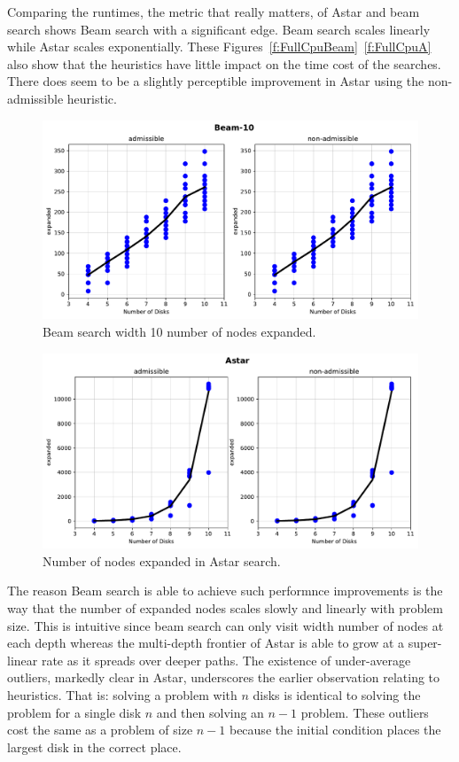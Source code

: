 \documentclass[12pt]{article}
\begin{document}
Comparing the runtimes, the metric that really matters, of Astar and beam search shows Beam search with a significant edge.
Beam search scales linearly while Astar scales exponentially.
These Figures~\ref{f:FullCpuBeam}~\ref{f:FullCpuA} also show that the heuristics have little impact on the time cost of the searches. 
There does seem to be a slightly perceptible improvement in Astar using the non-admissible heuristic.

\begin{figure}[H]
	\centering
    \includegraphics[width=.85\textwidth]{FullExpandedBeam-10}	
	\caption{Beam search width 10 number of nodes expanded.}
	\label{f:FullExBeam}
\end{figure}
\begin{figure}[H]
	\centering
    \includegraphics[width=.85\textwidth]{FullExpandedAstar}
	\caption{Number of nodes expanded in Astar search.}
	\label{f:FullExA}	
\end{figure}

The reason Beam search is able to achieve such performnce improvements is the way that the number of expanded nodes scales slowly and linearly with problem size.
This is intuitive since beam search can only visit width number of nodes at each depth whereas the multi-depth frontier of Astar is able to grow at a super-linear rate as it spreads over deeper paths. 
The existence of under-average outliers, markedly clear in Astar, underscores the earlier observation relating to heuristics.
That is: solving a problem with $n$ disks is identical to solving the problem for a single disk $n$ and then solving an $n-1$ problem.
These outliers cost the same as a problem of size $n-1$ because the initial condition places the largest disk in the correct place.
\end{document}
